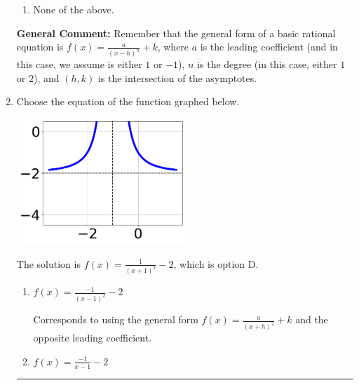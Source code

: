 \documentclass{extbook}[14pt]
\newcommand{\litem}[1]{\item #1

\rule{\textwidth}{0.4pt}}
\begin{document}
\begin{enumerate}
{\begin{enumerate}[label=\Alph*.]
\item None of the above.\end{enumerate}
\textbf{General Comment:} Remember that the general form of a basic rational equation is $ f(x) = \frac{a}{(x-h)^n} + k$, where $a$ is the leading coefficient (and in this case, we assume is either $1$ or $-1$), $n$ is the degree (in this case, either $1$ or $2$), and $(h, k)$ is the intersection of the asymptotes.
}
\litem{
Choose the equation of the function graphed below.

\begin{center}
    \includegraphics[width=0.5\textwidth]{../Figures/rationalGraphToEquationC.png}
\end{center}


The solution is \( f(x) = \frac{1}{(x + 1)^2} - 2 \), which is option D.\begin{enumerate}[label=\Alph*.]
\item \( f(x) = \frac{-1}{(x - 1)^2} - 2 \)

Corresponds to using the general form $f(x) = \frac{a}{(x+h)^2}+k$ and the opposite leading coefficient.
\item \( f(x) = \frac{-1}{x - 1} - 2 \)


\end{enumerate}}
\end{enumerate}
\end{document}
